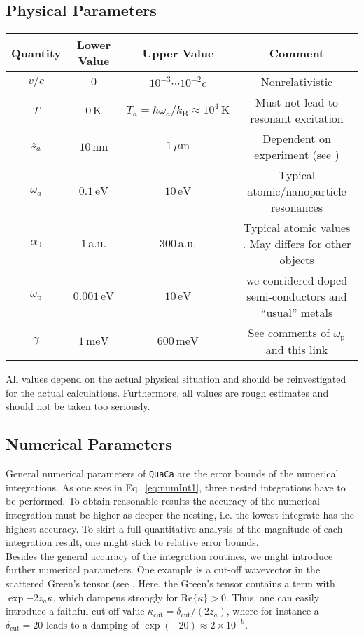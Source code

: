 \documentclass[11pt]{article}
\newcommand{\uni}[1]{\,\mathrm{#1}}
\begin{document}
\subsection{Physical Parameters}
\begin{table}[H]
\centering
\begin{tabular}{c|c|c|c}
\textbf{Quantity} & \textbf{Lower Value} & \textbf{Upper Value} & \textbf{Comment}
\\\hline
$v/c$  & $0$ & $10^{-3}\cdots 10^{-2} c$  & Nonrelativistic
\\\hline
$T$ & $0\,\mathrm{K}$ & $T_a = \hbar\omega_a/k_\mathrm{B} \approx 10^4\,\mathrm{K}$ & Must not lead to resonant excitation
\\\hline
$z_a$ & $10\,\mathrm{nm}$ & $1\,\mu\mathrm{m}$ & Dependent on experiment (see \cite{oelschlager2019a})
\\\hline
$\omega_a$ & $0.1\,\mathrm{eV}$ & $10\uni{eV}$ & Typical atomic/nanoparticle resonances
\\\hline
$\alpha_0$ & $1\uni{a.u.}$ & $300\uni{a.u.}$ & Typical atomic values \cite{schwerdtfeger2019}. May differs for other objects
\\\hline
$\omega_\mathrm{p}$ & $0.001\uni{eV}$ & $10\uni{eV}$ & we considered doped semi-conductors \cite{pirozhenko2008a} and ``usual'' metals \cite{nozieres1999}
\\\hline
$\gamma$ & $1\uni{meV}$ & $600\uni{meV}$  & See comments of $\omega_\mathrm{p}$ and \href{http://www.wave-scattering.com/drudefit.html}{this link}
\\\hline
\end{tabular}
\end{table}
All values depend on the actual physical situation and should be reinvestigated for the actual calculations. Furthermore, all values are rough estimates and should not be taken too seriously.
\subsection{Numerical Parameters}
General numerical parameters of \texttt{QuaCa} are the error bounds of the numerical integrations. As one sees in Eq.~\eqref{eq:numInt1}, three nested integrations have to be performed. To obtain reasonable results the accuracy of the numerical integration must be higher as deeper the nesting, i.e. the lowest integrate has the highest accuracy. To skirt a full quantitative analysis of the magnitude of each integration result, one might stick to relative error bounds.
\\
Besides the general accuracy of the integration routines, we might introduce further numerical parameters. One example is a cut-off wavevector in the scattered Green's tensor (see \cite{intravaia2016a}. Here, the Green's tensor contains a term with $\exp{-2z_a\kappa}$, which dampens strongly for $\mathrm{Re}\{\kappa\}> 0$. Thus, one can easily introduce a faithful cut-off value $\kappa_\mathrm{cut}=\delta_\mathrm{cut}/(2z_a)$, where for instance a $\delta_\mathrm{cut}=20$ leads to a damping of $\exp(-20)\approx 2\times 10^{-9}$.


\end{document}
